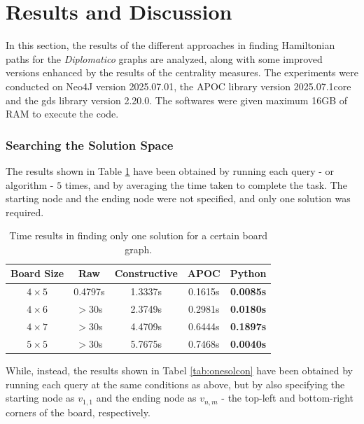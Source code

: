 \documentclass[conference]{IEEEtran}
\begin{document}
\section{Results and Discussion}
\label{sec:results}

In this section, the results of the different approaches in finding Hamiltonian paths for the \textit{Diplomatico} graphs are analyzed, along with some improved versions enhanced by the results of the centrality measures.
The experiments were conducted on Neo4J version 2025.07.01, the APOC library version 2025.07.1core and the gds library version 2.20.0. The softwares were given maximum 16GB of RAM to execute the code.

\subsubsection{Searching the Solution Space}
The results shown in Table \ref{tab:onesol} have been obtained by running each query - or algorithm - $5$ times, and by averaging the time taken to complete the task.
The starting node and the ending node were not specified, and only one solution was required.

\begin{table}[ht]
\centering
\begin{tabular}{|c|c c c c |}
\hline
\textbf{Board Size} & \textbf{Raw} & \textbf{Constructive} & \textbf{APOC} & \textbf{Python} \\ \hline
\textbf{$4 \times 5$} & 0.4797s & 1.3337s & 0.1615s & \textbf{0.0085s}  \\ \hline
\textbf{$4 \times 6$} & $>$30s & 2.3749s & 0.2981s & \textbf{0.0180s} \\ \hline
\textbf{$4 \times 7$} & $>$30s & 4.4709s & 0.6444s & \textbf{0.1897s} \\ \hline
\textbf{$5 \times 5$} & $>$30s & 5.7675s & 0.7468s & \textbf{0.0040s} \\ \hline
\end{tabular}
\caption{Time results in finding only one solution for a certain board graph.}
\label{tab:onesol}
\end{table}

While, instead, the results shown in Tabel \ref{tab:onesolcon} have been obtained by running each query at the same conditions as above, but by also specifying the starting node as $v_{1,1}$ and the ending node as $v_{n,m}$ - the top-left and bottom-right corners of the board, respectively.
\end{document}
